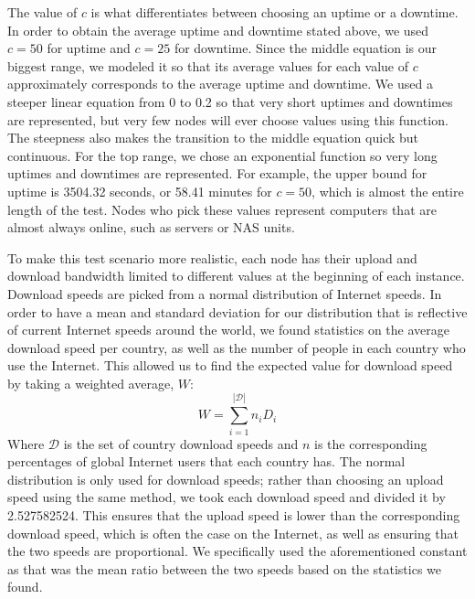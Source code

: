 \documentclass[12pt]{report}
\begin{document}
The value of $c$ is what differentiates between choosing an uptime or a downtime. In order to obtain the average uptime and downtime stated above, we used $c=50$ for uptime and $c=25$ for downtime. Since the middle equation is our biggest range, we modeled it so that its average values for each value of $c$ approximately corresponds to the average uptime and downtime. We used a steeper linear equation from 0 to 0.2 so that very short uptimes and downtimes are represented, but very few nodes will ever choose values using this function. The steepness also makes the transition to the middle equation quick but continuous. For the top range, we chose an exponential function so very long uptimes and downtimes are represented. For example, the upper bound for uptime is 3504.32 seconds, or 58.41 minutes for $c=50$, which is almost the entire length of the test. Nodes who pick these values represent computers that are almost always online, such as servers or NAS units.

To make this test scenario more realistic, each node has their upload and download bandwidth limited to different values at the beginning of each instance. Download speeds are picked from a normal distribution of Internet speeds. In order to have a mean and standard deviation for our distribution that is reflective of current Internet speeds around the world, we found statistics on the average download speed per country, as well as the number of people in each country who use the Internet. This allowed us to find the expected value for download speed by taking a weighted average, $W$:
$$
W=\sum\limits_{i=1}^{|\mathcal{D}|} n_iD_i
$$
Where $\mathcal{D}$ is the set of country download speeds and $n$ is the corresponding percentages of global Internet users that each country has. The normal distribution is only used for download speeds; rather than choosing an upload speed using the same method, we took each download speed and divided it by 2.527582524. This ensures that the upload speed is lower than the corresponding download speed, which is often the case on the Internet, as well as ensuring that the two speeds are proportional. We specifically used the aforementioned constant as that was the mean ratio between the two speeds based on the statistics we found.

\end{document}
